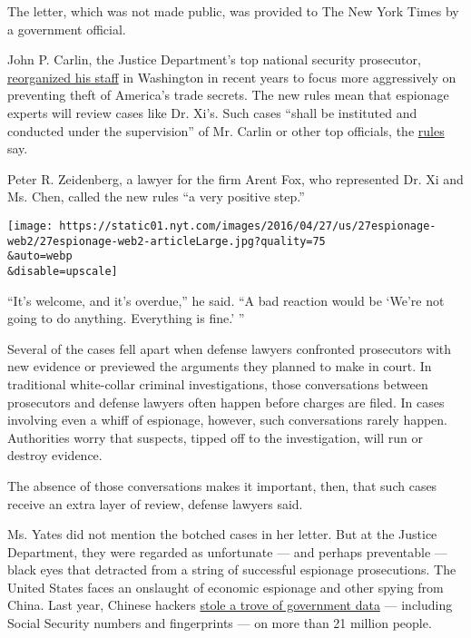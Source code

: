 The letter, which was not made public, was provided to The New York
Times by a government official.

John P. Carlin, the Justice Department's top national security
prosecutor,
\href{http://www.mainjustice.com/2014/10/21/dojs-national-security-division-reorganizes-for-cyber-and-corporate-espionage-threats/}{reorganized
his staff} in Washington in recent years to focus more aggressively on
preventing theft of America's trade secrets. The new rules mean that
espionage experts will review cases like Dr. Xi's. Such cases ``shall be
instituted and conducted under the supervision'' of Mr. Carlin or other
top officials, the
\href{https://www.justice.gov/usam/usam-9-90000-national-security}{rules}
say.

Peter R. Zeidenberg, a lawyer for the firm Arent Fox, who represented
Dr. Xi and Ms. Chen, called the new rules ``a very positive step.''

\texttt{[image: https://static01.nyt.com/images/2016/04/27/us/27espionage-web2/27espionage-web2-articleLarge.jpg?quality=75\\\&auto=webp\\\&disable=upscale]}

``It's welcome, and it's overdue,'' he said. ``A bad reaction would be
`We're not going to do anything. Everything is fine.' ''

Several of the cases fell apart when defense lawyers confronted
prosecutors with new evidence or previewed the arguments they planned to
make in court. In traditional white-collar criminal investigations,
those conversations between prosecutors and defense lawyers often happen
before charges are filed. In cases involving even a whiff of espionage,
however, such conversations rarely happen. Authorities worry that
suspects, tipped off to the investigation, will run or destroy evidence.

The absence of those conversations makes it important, then, that such
cases receive an extra layer of review, defense lawyers said.

Ms. Yates did not mention the botched cases in her letter. But at the
Justice Department, they were regarded as unfortunate --- and perhaps
preventable --- black eyes that detracted from a string of successful
espionage prosecutions. The United States faces an onslaught of economic
espionage and other spying from China. Last year, Chinese hackers
\href{http://www.nytimes.com/2015/07/10/us/office-of-personnel-management-hackers-got-data-of-millions.html}{stole
a trove of government data} --- including Social Security numbers and
fingerprints --- on more than 21 million people.

